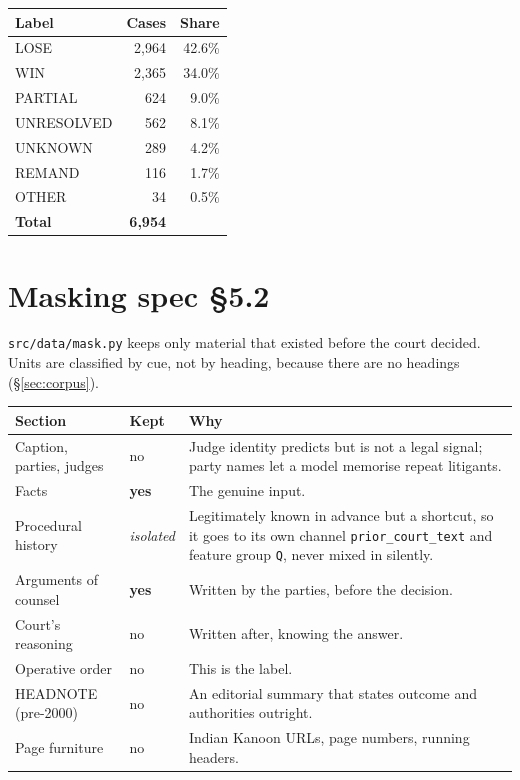 \documentclass[12pt,a4paper]{article}
\newcommand{\code}[1]{\texttt{\small #1}}
\newcommand{\spec}[1]{\textbf{spec §#1}}
\begin{document}
\begin{center}
\begin{tabular}{@{}lrr@{}}
\toprule
\textbf{Label} & \textbf{Cases} & \textbf{Share} \\
\midrule
LOSE & 2,964 & 42.6\% \\
WIN & 2,365 & 34.0\% \\
PARTIAL & 624 & 9.0\% \\
UNRESOLVED & 562 & 8.1\% \\
UNKNOWN & 289 & 4.2\% \\
REMAND & 116 & 1.7\% \\
OTHER & 34 & 0.5\% \\
\midrule
\textbf{Total} & \textbf{6,954} & \\
\bottomrule
\end{tabular}
\end{center}

\section{Masking \spec{5.2}}\label{sec:masking}

\code{src/data/mask.py} keeps only material that existed before the court decided. Units are
classified by cue, not by heading, because there are no headings (§\ref{sec:corpus}).

\begin{center}
\begin{tabular}{@{}llp{7.2cm}@{}}
\toprule
\textbf{Section} & \textbf{Kept} & \textbf{Why} \\
\midrule
Caption, parties, judges & no & Judge identity predicts but is not a legal signal; party names let a model memorise repeat litigants. \\
Facts & \textbf{yes} & The genuine input. \\
Procedural history & \emph{isolated} & Legitimately known in advance but a shortcut, so it goes to its own channel \code{prior\_court\_text} and feature group \code{Q}, never mixed in silently. \\
Arguments of counsel & \textbf{yes} & Written by the parties, before the decision. \\
Court's reasoning & no & Written after, knowing the answer. \\
Operative order & no & This is the label. \\
HEADNOTE (pre-2000) & no & An editorial summary that states outcome and authorities outright. \\
Page furniture & no & Indian Kanoon URLs, page numbers, running headers. \\
\bottomrule
\end{tabular}
\end{center}
\end{document}

